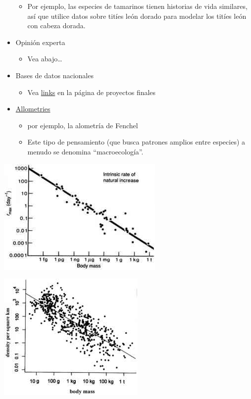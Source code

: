 \documentclass[
]{article}
\providecommand{\tightlist}{%
  \setlength{\itemsep}{0pt}\setlength{\parskip}{0pt}}
\begin{document}
\begin{itemize}
  \begin{itemize}
  \tightlist
  \item
    Por ejemplo, las especies de tamarinos tienen historias de vida
    similares, así que utilice datos sobre titíes león dorado para
    modelar los titíes león con cabeza dorada.
  \end{itemize}
\item
  Opinión experta

  \begin{itemize}
  \tightlist
  \item
    Vea abajo\ldots{}
  \end{itemize}
\item
  Bases de datos nacionales

  \begin{itemize}
  \tightlist
  \item
    Vea \href{FINAL_PROJECTS.html}{links} en la página de proyectos
    finales
  \end{itemize}
\item
  \href{https://www.astronomyclub.xyz/maternal-effect/does-ecology-have-laws.html}{Allometries}

  \begin{itemize}
  \tightlist
  \item
    por ejemplo, la alometría de Fenchel
  \item
    Este tipo de pensamiento (que busca patrones amplios entre especies)
    a menudo se denomina ``macroecología''.
  \end{itemize}
\end{itemize}

\includegraphics{figures/allometry2.jpg}

\includegraphics{figures/allometry1.jpg}
\end{document}

